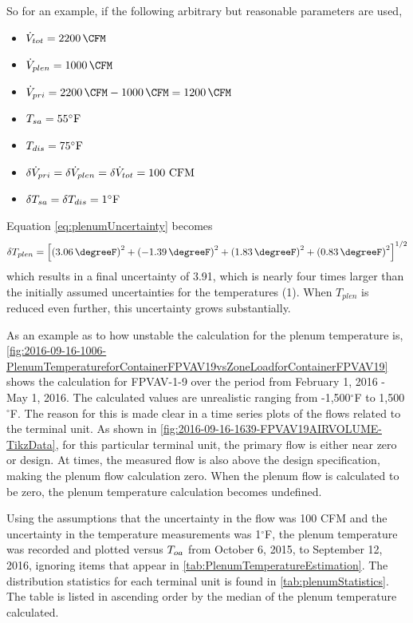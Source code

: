 So for an example, if the following arbitrary but reasonable parameters are used, 
%
\newcommand{\flowtotvalue}{\SI{2200}{\CFM}}
\newcommand{\plenflowvalue}{\SI{1000}{\CFM}}
%
\begin{itemize}
    \item \(\totflow{}=\flowtotvalue\)
    \item \(\plenflow{}=\plenflowvalue\)
    \item \(\priflow=\flowtotvalue - \plenflowvalue = \SI{1200}{\CFM} \)
    \item \(T_{sa} = 55^{\circ}\text{F} \)
    \item \(T_{dis} = 75^{\circ}\text{F} \)
    \item \(\delta\dot{V}_{pri}{}=\delta\dot{V}_{plen}=\delta\dot{V}_{tot}=100 \text{ CFM}\)
    \item \(\delta T_{sa} = \delta T_{dis} = 1^{\circ} \text{F} \)
\end{itemize}
%
Equation \ref{eq:plenumUncertainty} becomes
\begin{equation}\label{eq:plenumUncertainty2}
    \delta T_{plen} = \left[\left(  \SI{3.06}{\degreeF}  \right)^2  +\left( \SI{-1.39}{\degreeF}  \right)^2 +  \left( \SI{1.83}{\degreeF} \right)^2 + \left(\SI{0.83}{\degreeF}  \right)^2  \right]^{1/2}
\end{equation}
which results in a final uncertainty of \SI{3.91}{\degreeF}, which is
nearly four times larger than the initially assumed uncertainties for
the temperatures (\SI{1}{\degreeF}). When \(T_{plen}\) is reduced even
further, this uncertainty grows substantially.  

As an example as to how unstable the calculation for the plenum
temperature is, \figref{}
\ref{fig:2016-09-16-1006-PlenumTemperatureforContainerFPVAV19vsZoneLoadforContainerFPVAV19}
shows the calculation for FPVAV-1-9 over the period from February 1,
2016 - May 1, 2016. The calculated values are unrealistic ranging from
-1,500\(^\circ\)F to 1,500\(^\circ\)F. The reason for this is made clear
in a time series plots of the flows related to the terminal unit. As
shown in \figref{} \ref{fig:2016-09-16-1639-FPVAV19AIRVOLUME-TikzData},
for this particular terminal unit, the primary flow is either near zero
or design. At times, the measured flow is also above the design
specification, making the plenum flow calculation zero. When the plenum flow is
calculated to be zero, the plenum temperature calculation becomes
undefined.

Using the assumptions that the uncertainty in the flow was 100 CFM and
the uncertainty in the temperature measurements was 1\(^\circ\)F, the
plenum temperature was recorded and plotted versus \(T_{oa}\) from October
6, 2015, to September 12, 2016, ignoring items that appear in \tableref{}
\ref{tab:PlenumTemperatureEstimation}. The distribution statistics for
each terminal unit is found in \tableref{} \ref{tab:plenumStatistics}.
The table is listed in ascending order by the median of the plenum
temperature calculated.

